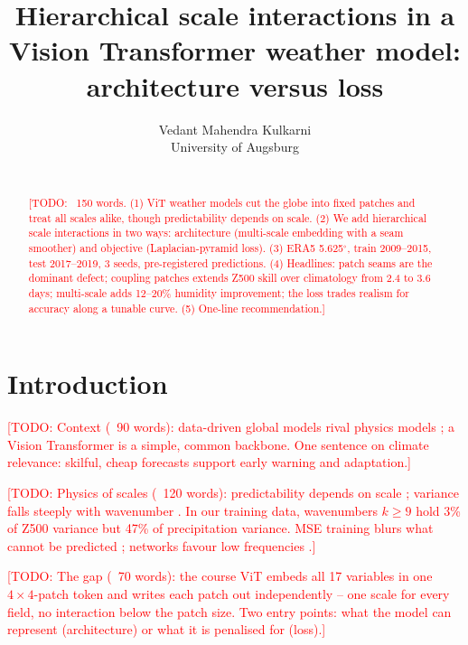 \documentclass{article}
\title{Hierarchical scale interactions in a Vision Transformer weather model: architecture versus loss}
\author{%
  Vedant Mahendra Kulkarni \\
  University of Augsburg \\
  \texttt{\todo{your university e-mail}} \\
}
\newcommand{\todo}[1]{\textcolor{red}{[TODO: #1]}}
\begin{document}
\maketitle

\begin{abstract}
\todo{~150 words. (1) ViT weather models cut the globe into fixed patches and treat all scales alike, though predictability depends on scale. (2) We add hierarchical scale interactions in two ways: architecture (multi-scale embedding with a seam smoother) and objective (Laplacian-pyramid loss). (3) ERA5 5.625$^\circ$, train 2009--2015, test 2017--2019, 3 seeds, pre-registered predictions. (4) Headlines: patch seams are the dominant defect; coupling patches extends Z500 skill over climatology from 2.4 to 3.6 days; multi-scale adds 12--20\% humidity improvement; the loss trades realism for accuracy along a tunable curve. (5) One-line recommendation.}
\end{abstract}

\section{Introduction}
\label{sec:intro}

\todo{Context (~90 words): data-driven global models rival physics models \cite{lam2023graphcast, bi2023pangu, pathak2022fourcastnet, keisler2022gnn}; a Vision Transformer \cite{dosovitskiy2021vit} is a simple, common backbone. One sentence on climate relevance: skilful, cheap forecasts support early warning and adaptation.}

\todo{Physics of scales (~120 words): predictability depends on scale \cite{lorenz1969predictability}; variance falls steeply with wavenumber \cite{nastrom1985climatology}. In our training data, wavenumbers $k \geq 9$ hold 3\% of Z500 variance but 47\% of precipitation variance. MSE training blurs what cannot be predicted \cite{subich2025doublepenalty}; networks favour low frequencies \cite{rahaman2019spectral}.}

\todo{The gap (~70 words): the course ViT embeds all 17 variables in one $4\times4$-patch token and writes each patch out independently -- one scale for every field, no interaction below the patch size. Two entry points: what the model can represent (architecture) or what it is penalised for (loss).}
\end{document}
